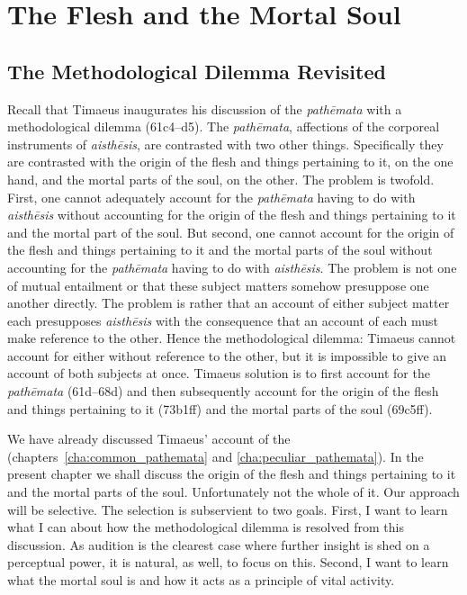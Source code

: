
\chapter{The Flesh and the Mortal Soul} %
\label{cha:the_flesh_and_the_mortal_soul}

\section{The Methodological Dilemma Revisited} %
\label{sec:the_methodological_dilemma_revisited}

Recall that Timaeus inaugurates his discussion of the \emph{pathēmata} with a methodological dilemma (61c4–d5). The \emph{pathēmata}, affections of the corporeal instruments of \emph{aisthēsis}, are contrasted with two other things. Specifically they are contrasted with the origin of the flesh and things pertaining to it, on the one hand, and the mortal parts of the soul, on the other. The problem is twofold. First, one cannot adequately account for the \emph{pathēmata} having to do with \emph{aisthēsis} without accounting for the origin of the flesh and things pertaining to it and the mortal part of the soul. But second, one cannot account for the origin of the flesh and things pertaining to it and the mortal parts of the soul without accounting for the \emph{pathēmata} having to do with \emph{aisthēsis}. The problem is not one of mutual entailment or that these subject matters somehow presuppose one another directly. The problem is rather that an account of either subject matter each presupposes \emph{aisthēsis} with the consequence that an account of each must make reference to the other. Hence the methodological dilemma: Timaeus cannot account for either without reference to the other, but it is impossible to give an account of both subjects at once. Timaeus solution is to first account for the \emph{pathēmata} (61d–68d) and then subsequently account for the origin of the flesh and things pertaining to it (73b1ff) and the mortal parts of the soul (69c5ff). 

We have already discussed Timaeus' account of the (chapters~\ref{cha:common_pathemata} and \ref{cha:peculiar_pathemata}). In the present chapter we shall discuss the origin of the flesh and things pertaining to it and the mortal parts of the soul. Unfortunately not the whole of it. Our approach will be selective. The selection is subservient to two goals. First, I want to learn what I can about how the methodological dilemma is resolved from this discussion. As audition is the clearest case where further insight is shed on a perceptual power, it is natural, as well, to focus on this. Second, I want to learn what the mortal soul is and how it acts as a principle of vital activity.

